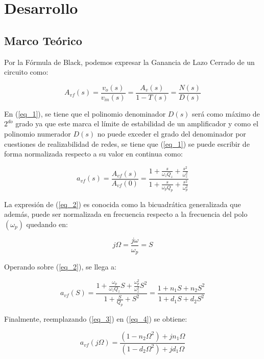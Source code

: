 \documentclass[12pt,a4paper]{article}
\begin{document}
\section{Desarrollo}
\subsection{Marco Teórico}
Por la Fórmula de Black, podemos expresar la Ganancia de Lazo Cerrado de un circuito como:

\begin{equation}
    \label{eq_1}
    A_{vf}(s) = \frac{v_{o}(s)}{v_{in}(s)} = \frac{A_{v}(s)}{1-T(s)} = \frac{N(s)}{D(s)}
\end{equation}

En (\ref{eq_1}), se tiene que el polinomio denominador $D(s)$ será como máximo de $2^{do}$ grado ya que este marca el límite de estabilidad de un amplificador y como el polinomio numerador $D(s)$ no puede exceder el grado del denominador por cuestiones de realizabilidad de redes, se tiene que (\ref{eq_1}) se puede escribir de forma normalizada respecto a su valor en continua como:

\begin{equation}
    \label{eq_2}
    a_{vf}(s) = \frac{A_{vf}(s)}{A_{vf}(0)} = \frac{1 + \frac{s}{\omega_{z}Q_{z}} + \frac{s^{2}}{\omega_{z}^{2}}}{1 + \frac{s}{\omega_{p}Q_{p}} + \frac{s^{2}}{\omega_{p}^{2}}}
\end{equation}

La expresión de (\ref{eq_2}) es conocida como la bicuadrática generalizada que además, puede ser normalizada en frecuencia respecto a la frecuencia del polo $(\omega_p)$ quedando en:

\begin{equation}
    \label{eq_3}
    j\Omega = \frac{j\omega}{\omega_p} =S 
\end{equation}

Operando sobre (\ref{eq_2}), se llega a:

\begin{equation}
    \label{eq_4}
    a_{vf}(S) = \frac{1 + \frac{\omega_{p}}{\omega_{z} Q_{z}}S + \frac{\omega_p^{2}}{\omega_z^{2}}S^2}{1 + \frac{S}{Q_p} + S^2} = \frac{1 + n_1 S + n_2 S^2}{1 + d_1 S + d_2 S^2}
\end{equation}

Finalmente, reemplazando (\ref{eq_3}) en (\ref{eq_4}) se obtiene:
 
\begin{equation}
    \label{eq_5}
    a_{vf}(j\Omega) = \frac{(1 - n_2 \Omega^2) + jn_1 \Omega}{(1 - d_2 \Omega^2) + jd_1 \Omega}
\end{equation}
\end{document}
